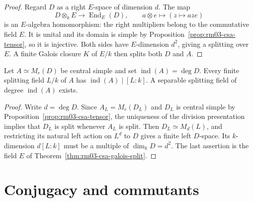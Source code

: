 \begin{proof}
Regard \(D\) as a right \(E\)-space of dimension \(d\). The map
\[
 D\otimes_k E\longrightarrow \operatorname{End}_E(D),\qquad
 a\otimes e\longmapsto (z\mapsto aze)
\]
is an \(E\)-algebra homomorphism: the right multipliers belong to
the commutative field \(E\). It is unital and its domain is simple
by Proposition~\ref{prop:rm03-csa-tensor}, so it is injective.
Both sides have \(E\)-dimension \(d^2\), giving a splitting over
\(E\). A finite Galois closure \(K\) of \(E/k\) then splits both \(D\)
and \(A\).
\end{proof}

\begin{corollary}
\label{cor:rm03-csa-index}
Let \(A\simeq M_r(D)\) be central simple and set
\(\operatorname{ind}(A)=\deg D\). Every finite splitting field
\(L/k\) of \(A\) has \(\operatorname{ind}(A)\mid [L:k]\).
A separable splitting field of degree \(\operatorname{ind}(A)\)
exists.
\end{corollary}
\begin{proof}
Write \(d=\deg D\). Since \(A_L=M_r(D_L)\) and \(D_L\) is central
simple by Proposition~\ref{prop:rm03-csa-tensor}, the uniqueness
of the division presentation implies that \(D_L\) is split
whenever \(A_L\) is split. Then \(D_L\simeq M_d(L)\), and
restricting its natural left action on \(L^d\) to \(D\) gives a
finite left \(D\)-space. Its \(k\)-dimension \(d[L:k]\) must be a
multiple of \(\dim_k D=d^2\). The last assertion is the field \(E\)
of Theorem~\ref{thm:rm03-csa-galois-split}.
\end{proof}

\section{Conjugacy and commutants}

